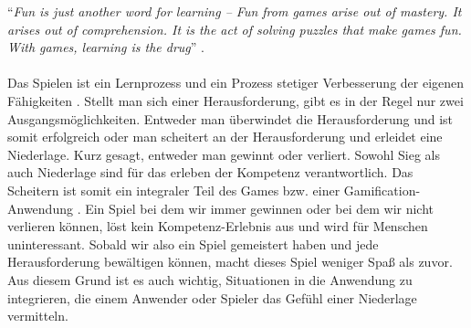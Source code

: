 \documentclass[a4paper,12pt,twoside]{scrartcl}
\begin{document}
\enquote{\textit{Fun is just another word for learning – Fun from games arise out of mastery. It arises out of comprehension. It is the act of solving puzzles that make games fun. With games, learning is the drug}} \cite{Koster2013}. 
\\\\
Das Spielen ist ein Lernprozess und ein Prozess stetiger Verbesserung der eigenen Fähigkeiten \cite{Rigby2011}. Stellt man sich einer Herausforderung, gibt es in der Regel nur zwei Ausgangsmöglichkeiten. Entweder man überwindet die Herausforderung und ist somit erfolgreich oder man scheitert an der Herausforderung und erleidet eine Niederlage. Kurz gesagt, entweder man gewinnt oder verliert. Sowohl Sieg als auch Niederlage sind für das erleben der Kompetenz verantwortlich. Das Scheitern ist somit ein integraler Teil des Games bzw. einer Gamification-Anwendung \cite{Mcgonigal2011}\cite{Lazzaro2004}. Ein Spiel bei dem wir immer gewinnen oder bei dem wir nicht verlieren können, löst kein Kompetenz-Erlebnis aus und wird für Menschen uninteressant. Sobald wir also ein Spiel gemeistert haben und jede Herausforderung bewältigen können, macht dieses Spiel weniger Spaß als zuvor. Aus diesem Grund ist es auch wichtig, Situationen in die Anwendung zu integrieren, die einem Anwender oder Spieler das Gefühl einer Niederlage vermitteln. 
\end{document}
